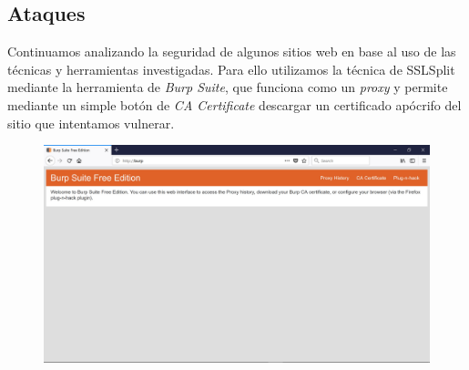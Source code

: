 \documentclass[10pt,a4paper]{article}
\begin{document}
\subsection{Ataques}

Continuamos analizando la seguridad de algunos sitios web en base al uso de las técnicas y herramientas investigadas. Para ello utilizamos la técnica de SSLSplit mediante la herramienta de \textit{Burp Suite}, que funciona como un \textit{proxy} y permite mediante un simple botón de \textit{CA Certificate} descargar un certificado apócrifo del sitio que intentamos vulnerar.


\begin{figure}[H]
\centerline{\includegraphics[scale=0.4]{images/certificado.jpg}}
\caption{}
\end{figure}


\end{document}
